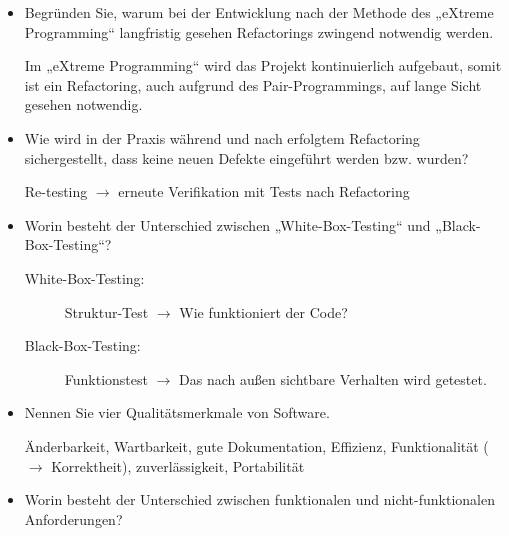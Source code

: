 \documentclass{lehramt-informatik-aufgabe}
\begin{document}
\begin{itemize}
%

\item Begründen Sie, warum bei der Entwicklung nach der Methode des
„eXtreme Programming“ langfristig gesehen
Refactorings zwingend notwendig werden.

\begin{antwort}
Im „eXtreme Programming“ wird das Projekt kontinuierlich aufgebaut,
somit ist ein Refactoring, auch aufgrund des Pair-Programmings, auf
lange Sicht gesehen notwendig.
\end{antwort}

%

\item Wie wird in der Praxis während und nach erfolgtem Refactoring
sichergestellt, dass keine neuen Defekte eingeführt werden bzw. wurden?

\begin{antwort}
Re-testing $\rightarrow$ erneute Verifikation mit Tests nach Refactoring
\end{antwort}

%

\item Worin besteht der Unterschied zwischen
„White-Box-Testing“ und
„Black-Box-Testing“?

\begin{antwort}
\begin{description}
\item[White-Box-Testing:]
Struktur-Test $\rightarrow$ Wie funktioniert der Code?

\item[Black-Box-Testing:]
Funktionstest $\rightarrow$ Das nach außen sichtbare Verhalten wird
getestet.
\end{description}
\end{antwort}

%

\item Nennen Sie vier Qualitätsmerkmale von Software.

\begin{antwort}
Änderbarkeit, Wartbarkeit, gute Dokumentation, Effizienz, Funktionalität
($\rightarrow$ Korrektheit), zuverlässigkeit, Portabilität
\end{antwort}

%

\item Worin besteht der Unterschied zwischen
funktionalen und nicht-funktionalen
Anforderungen?


\end{itemize}
\end{document}
